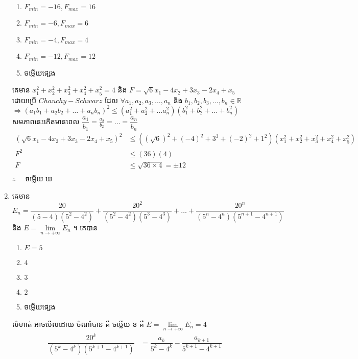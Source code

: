\documentclass[12pt, a4paper]{article}
\begin{document}
\begin{enumerate}[m]
\begin{enumerate}[k,3]
		\item $F_{min}=-16,F_{max}=16$
		\item $F_{min}=-6,F_{max}=6$
		\item $F_{min}=-4,F_{max}=4$
		\item $F_{min}=-12,F_{max}=12$
		\item ចម្លើយផ្សេង
	\end{enumerate}
	\answer
	\begin{center}
		គេមាន $x_1^2+x_2^2+x_3^2+x_4^2+x_5^2=4$ និង $F=\sqrt{6}x_1-4x_2+3x_3-2x_4+x_5$ \\
		ដោយប្រើ $Chauchy-Schwarz$ ដែល $\forall a_1,a_2, a_3,\dots,a_n$ និង $b_1, b_2, b_3,\dots,b_n \in\mathbb{R}$\\
		$\Rightarrow\left(a_1b_1+a_2b_2+\dots+a_nb_n\right)^2\le\left(a_1^2+a_2^2+\dots a_n^2\right)\left(b_1^2+b_2^2+\dots +b_n^2\right)$\\
		សមភាពនេះកើតមានពេល
		$\dfrac{a_1}{b_1}=\frac{a_2}{b_2}=\dots=\dfrac{a_n}{b_n}$
		\begin{align*}
		\left(\sqrt{6}x_1-4x_2+3x_3-2x_4+x_5\right)^2&\le\left(\left(\sqrt{6}\right)^2+\left(-4\right)^2+3^3+\left(-2\right)^2+1^2\right)\left(x_1^2+x_2^2+x_3^2+x_4^2+x_5^2\right)\\
		F^2&\le\left(36\right)\left(4\right)\\
		F&\le\sqrt{36\times4}=\pm12\\
		\end{align*}
		$\therefore \quad$ \kml ចម្លើយ \kbk ឃ
	\end{center}
	\newpage
	\item គេមាន $E_n=\dfrac{20}{\left(5-4\right)\left(5^2-4^2\right)}+\dfrac{20^2}{\left(5^2-4^2\right)\left(5^3-4^3\right)}+\dots+\dfrac{20^n}{\left(5^n-4^n\right)\left(5^{n+1}-4^{n+1}\right)}$ និង $E=\lim\limits_{n\to+\infty}E_n$ ។ គេបាន\\
	\begin{enumerate}[k,5]
		\item $E=5$
		\item $4$
		\item $3$
		\item $2$
		\item ចម្លើយផ្សេង
	\end{enumerate}
	\answer
	\begin{center}
		លំហាត់ អាចមើលដោយ ចំណាំបាន គឺ \kml ចម្លើយ \kbk ខ គឺ $E=\lim\limits_{n\to+\infty}E_n=4$\\
		\begin{align*}
			\dfrac{20^k}{\left(5^k-4^k\right)\left(5^{k+1}-4^{k+1}\right)}&=\dfrac{a_{k}}{5^k-4^k}-\dfrac{a_{k+1}}{5^{k+1}-4^{k+1}}\\

\end{align*}
\end{center}
\end{enumerate}
\end{document}
